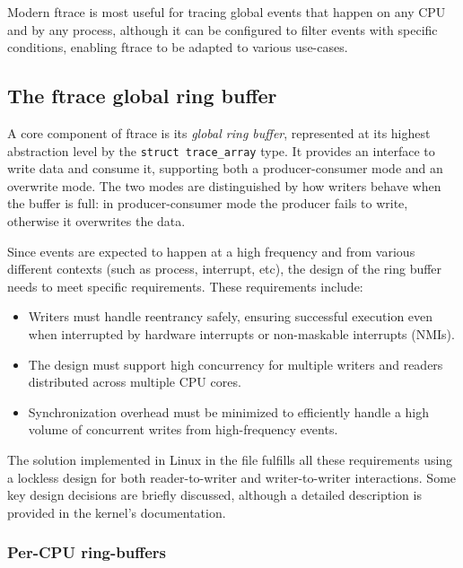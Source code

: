 Modern ftrace is most useful for tracing global events that happen on any CPU
and by any process, although it can be configured to filter events with specific
conditions, enabling ftrace to be adapted to various use-cases.

\subsection{The ftrace global ring buffer}

A core component of ftrace is its \textit{global ring buffer}, represented at
its highest abstraction level by the \verb|struct trace_array| type. It provides
an interface to write data and consume it, supporting both a producer-consumer
mode and an overwrite mode. The two modes are distinguished by how writers
behave when the buffer is full: in producer-consumer mode the producer fails to
write, otherwise it overwrites the data.

Since events are expected to happen at a high frequency and from various
different contexts (such as process, interrupt, etc), the design of the ring
buffer needs to meet specific requirements. These requirements include:

\begin{itemize}

  \item Writers must handle reentrancy safely, ensuring successful execution
    even when interrupted by hardware interrupts or non-maskable interrupts
    (NMIs).

  \item The design must support high concurrency for multiple writers and
    readers distributed across multiple CPU cores.

  \item Synchronization overhead must be minimized to efficiently handle a high
volume of concurrent writes from high-frequency events.

\end{itemize}

The solution implemented in Linux in the file
 fulfills all these
requirements using a lockless design for both reader-to-writer and
writer-to-writer interactions. Some key design decisions are briefly discussed,
although a detailed description is provided in the kernel's documentation.

\subsubsection*{Per-CPU ring-buffers}

